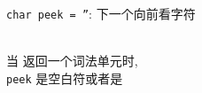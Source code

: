 \begin{frame}{}
  \begin{center}
    \pause

    \pause
    \texttt{char peek = ''}: 下一个向前看字符

    \pause
    \vspace{0.30cm}
     \\[6pt]
    当\textsc{} 返回一个词法单元时, \\[3pt]
    \texttt{peek} 是空白符或者是
  \end{center}
\end{frame}
